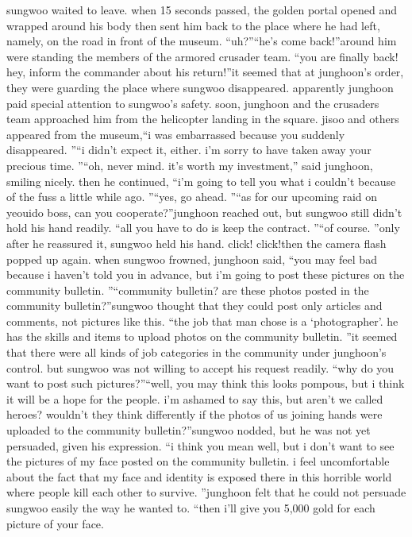 sungwoo waited to leave.
 when 15 seconds passed, the golden portal opened and wrapped around his body then sent him back to the place where he had left, namely, on the road in front of the museum.
“uh?”“he’s come back!”around him were standing the members of the armored crusader team.
“you are finally back! hey, inform the commander about his return!”it seemed that at junghoon’s order, they were guarding the place where sungwoo disappeared.
 apparently junghoon paid special attention to sungwoo’s safety.
soon, junghoon and the crusaders team approached him from the helicopter landing in the square.
 jisoo and others appeared from the museum,“i was embarrassed because you suddenly disappeared.
”“i didn’t expect it, either.
 i’m sorry to have taken away your precious time.
”“oh, never mind.
 it’s worth my investment,” said junghoon, smiling nicely.
then he continued, “i’m going to tell you what i couldn’t because of the fuss a little while ago.
”“yes, go ahead.
”“as for our upcoming raid on yeouido boss, can you cooperate?”junghoon reached out, but sungwoo still didn’t hold his hand readily.
“all you have to do is keep the contract.
”“of course.
”only after he reassured it, sungwoo held his hand.
click! click!then the camera flash popped up again.
 when sungwoo frowned, junghoon said, “you may feel bad because i haven’t told you in advance, but i’m going to post these pictures on the community bulletin.
”“community bulletin? are these photos posted in the community bulletin?”sungwoo thought that they could post only articles and comments, not pictures like this.
“the job that man chose is a ‘photographer’.
 he has the skills and items to upload photos on the community bulletin.
”it seemed that there were all kinds of job categories in the community under junghoon’s control.
 but sungwoo was not willing to accept his request readily.
“why do you want to post such pictures?”“well, you may think this looks pompous, but i think it will be a hope for the people.
 i’m ashamed to say this, but aren’t we called heroes? wouldn’t they think differently if the photos of us joining hands were uploaded to the community bulletin?”sungwoo nodded, but he was not yet persuaded, given his expression.
“i think you mean well, but i don’t want to see the pictures of my face posted on the community bulletin.
 i feel uncomfortable about the fact that my face and identity is exposed there in this horrible world where people kill each other to survive.
”junghoon felt that he could not persuade sungwoo easily the way he wanted to.
“then i’ll give you 5,000 gold for each picture of your face.
